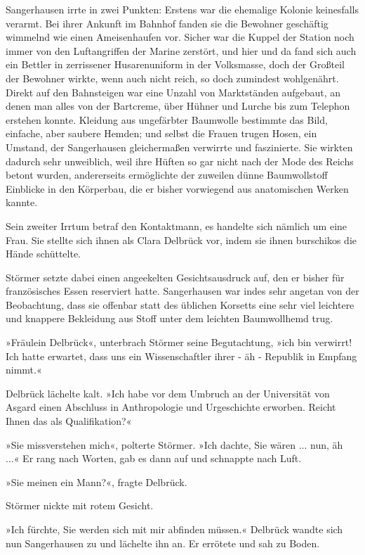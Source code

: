 \bigpar

Sangerhausen irrte in zwei Punkten: Erstens war die ehemalige
Kolonie keinesfalls verarmt. Bei ihrer Ankunft im Bahnhof fanden
sie die Bewohner geschäftig wimmelnd wie einen Ameisenhaufen vor.
Sicher war die Kuppel der Station noch immer von den Luftangriffen
der Marine zerstört, und hier und da fand sich auch ein Bettler in
zerrissener Husarenuniform in der Volksmasse, doch der Großteil der
Bewohner wirkte, wenn auch nicht reich, so doch zumindest
wohlgenährt. Direkt auf den Bahnsteigen war eine Unzahl von
Marktständen aufgebaut, an denen man alles von der Bartcreme, über
Hühner und Lurche bis zum Telephon erstehen konnte. Kleidung aus
ungefärbter Baumwolle bestimmte das Bild, einfache, aber saubere
Hemden; und selbst die Frauen trugen Hosen, ein Umstand, der
Sangerhausen gleichermaßen verwirrte und faszinierte. Sie wirkten
dadurch sehr unweiblich, weil ihre Hüften so gar nicht nach der
Mode des Reichs betont wurden, andererseits ermöglichte der
zuweilen dünne Baumwollstoff Einblicke in den Körperbau, die er
bisher vorwiegend aus anatomischen Werken kannte.

Sein zweiter Irrtum betraf den Kontaktmann, es handelte sich
nämlich um eine Frau. Sie stellte sich ihnen als Clara Delbrück
vor, indem sie ihnen burschikos die Hände schüttelte.

Störmer setzte dabei einen angeekelten Gesichtsausdruck auf, den er
bisher für französisches Essen reserviert hatte. Sangerhausen war
indes sehr angetan von der Beobachtung, dass sie offenbar statt des
üblichen Korsetts eine sehr viel leichtere und knappere Bekleidung
aus Stoff unter dem leichten Baumwollhemd trug.

»Fräulein Delbrück«, unterbrach Störmer seine Begutachtung, »ich
bin verwirrt! Ich hatte erwartet, dass uns ein Wissenschaftler
ihrer - äh - Republik in Empfang nimmt.«

Delbrück lächelte kalt. »Ich habe vor dem Umbruch an der
Universität von Asgard einen Abschluss in Anthropologie und
Urgeschichte erworben. Reicht Ihnen das als Qualifikation?«

»Sie missverstehen mich«, polterte Störmer. »Ich dachte, Sie wären
... nun, äh ...« Er rang nach Worten, gab es dann auf und schnappte
nach Luft.

»Sie meinen ein Mann?«, fragte Delbrück.

Störmer nickte mit rotem Gesicht.

»Ich fürchte, Sie werden sich mit mir abfinden müssen.« Delbrück
wandte sich nun Sangerhausen zu und lächelte ihn an. Er errötete
und sah zu Boden.

